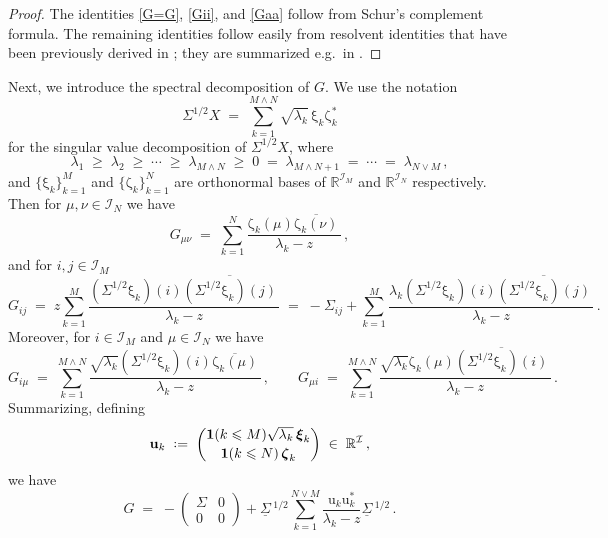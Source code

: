 \documentclass[11pt]{article} %
\numberwithin{equation}{section}
\numberwithin{figure}{section}
\theoremstyle{plain} %
\theoremstyle{definition} %
\newcommand{\f}[1]{\boldsymbol{\mathrm{#1}}} %
\renewcommand{\cal}{\mathcal}
\newcommand{\ul}[1]{\underline{#1} \!\,} %
\newcommand{\ol}[1]{\overline{#1} \!\,} %
\newcommand{\R}{\mathbb{R}}
\newcommand*{\deq}{\mathrel{\vcenter{\baselineskip0.65ex \lineskiplimit0pt \hbox{.}\hbox{.}}}=}
\renewcommand{\leq}{\leqslant}
\renewcommand{\geq}{\geqslant}
\newcommand{\ind}[1]{\f 1 (#1)}
\newcommand{\be}{\begin{equation}}
\newcommand{\ee}{\end{equation}}
\begin{document}
\begin{proof}
The identities \eqref{G=G}, \eqref{Gii}, and \eqref{Gaa} follow from Schur's complement formula. The remaining identities follow easily from resolvent identities that have been previously derived in \cite{EYY1, EKYY2}; they are summarized e.g.\ in \cite[Lemma 4.5]{EKYY4}.
\end{proof}
 


Next, we introduce the spectral decomposition of $G$.
We use the notation
\begin{equation*}
\Sigma^{1/2} X \;=\; \sum_{k=1}^{M \wedge N}\sqrt{\lambda_k} \, \f \xi_k \f \zeta_k^*
\end{equation*}
for the singular value decomposition of $\Sigma^{1/2} X$, where
\begin{equation*}
\lambda_1 \;\geq\; \lambda_2 \;\geq\; \cdots \;\geq\; \lambda_{M \wedge N}  \;\geq\; 0 \;=\; \lambda_{M \wedge N + 1} \;=\; \cdots\;=\; \lambda_{N \vee M}\,,
\end{equation*}
and $\{\f \xi_k\}_{k = 1}^M$ and $\{\f \zeta_k\}_{k = 1}^N$ are orthonormal bases of $\R^{\cal I_M}$ and $\R^{\cal I_N}$ respectively.
Then for $\mu, \nu \in \cal I_N$ we have
\begin{equation} \label{GN_spec}
 G_{\mu \nu} \;=\; \sum_{k=1}^N\frac{\f \zeta_k(\mu) \ol{\f \zeta_k(\nu)}}{\lambda_k-z}\,,
\end{equation}
 and for $i,j \in \cal I_M$
\begin{equation} \label{GM_spec}
G_{ij} \;=\; z \sum_{k=1}^M \frac{  (\Sigma^{1/2}\f \xi_k)(i) \ol{(\Sigma^{1/2} \f \xi_k) (j)}}{\lambda_k-z} \;=\; -\Sigma_{ij} + \sum_{k = 1}^M \frac{ \lambda_k (\Sigma^{1/2}\f \xi_k)(i)\ol{(\Sigma^{1/2}\f \xi_k) (j)}}{\lambda_k-z}\,.
\end{equation}
Moreover, for $i \in \cal I_M$ and $\mu \in \cal I_N$ we have
\begin{equation} \label{Gial}
G_{i \mu} \;=\; \sum_{k = 1}^{M \wedge N} \frac{\sqrt{\lambda_k} (\Sigma^{1/2} \f \xi_k)(i) \ol{\f \zeta_k(\mu)}}{\lambda_k - z}\,, \qquad  G_{\mu i} \;=\; \sum_{k = 1}^{M \wedge N} \frac{\sqrt{\lambda_k} \f \zeta_k(\mu) \ol{(\Sigma^{1/2}\f \xi_k)(i)}}{\lambda_k-z}\,.
\end{equation}
Summarizing, defining
\begin{equation*}
\f u_k \;\deq\; \binom{\ind{k \leq M}\sqrt{\lambda_k} \, \f \xi_k}{\ind{k \leq N} \, \f \zeta_k} \;\in\; \R^{\cal I}\,,
\end{equation*}
we have
\be\label{decompfullG}
G \;=\;
- \begin{pmatrix}
\Sigma & 0
\\
0 & 0
\end{pmatrix}
+ \ul \Sigma^{1/2} \sum_{k = 1}^{N \vee M} \frac{\f u_k \f u_k^*}{\lambda_k-z} \ul \Sigma^{1/2}\,.
\ee
\end{document}
